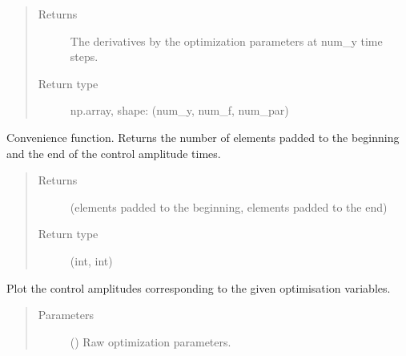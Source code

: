 \documentclass[letterpaper,10pt,english]{sphinxmanual}
\begin{document}
\begin{fulllineitems}
\begin{fulllineitems}
\begin{quote}
\begin{description}
\item[{Returns}] \leavevmode
{} \textendash{} The derivatives by the optimization parameters at num\_y time steps.

\item[{Return type}] \leavevmode
np.array, shape: (num\_y, num\_f, num\_par)

\end{description}\end{quote}

\end{fulllineitems}


\begin{fulllineitems}
\label{\detokenize{qsim:qsim.transfer_function.TransferFunction.num_padding_elements}}
Convenience function. Returns the number of elements padded to the
beginning and the end of the control amplitude times.
\begin{quote}\begin{description}
\item[{Returns}] \leavevmode
{} \textendash{} (elements padded to the beginning, elements padded to the end)

\item[{Return type}] \leavevmode
(int, int)

\end{description}\end{quote}

\end{fulllineitems}


\begin{fulllineitems}
\label{\detokenize{qsim:qsim.transfer_function.TransferFunction.plot_pulse}}
Plot the control amplitudes corresponding to the given optimisation
variables.
\begin{quote}\begin{description}
\item[{Parameters}] \leavevmode
{} (\sphinxstyleliteralemphasis{\sphinxupquote{, }}\sphinxstyleliteralemphasis{\sphinxupquote{ (}}\sphinxstyleliteralemphasis{\sphinxupquote{, }}\sphinxstyleliteralemphasis{\sphinxupquote{)}}) \textendash{} Raw optimization parameters.


\end{description}
\end{quote}
\end{fulllineitems}
\end{fulllineitems}
\end{document}
